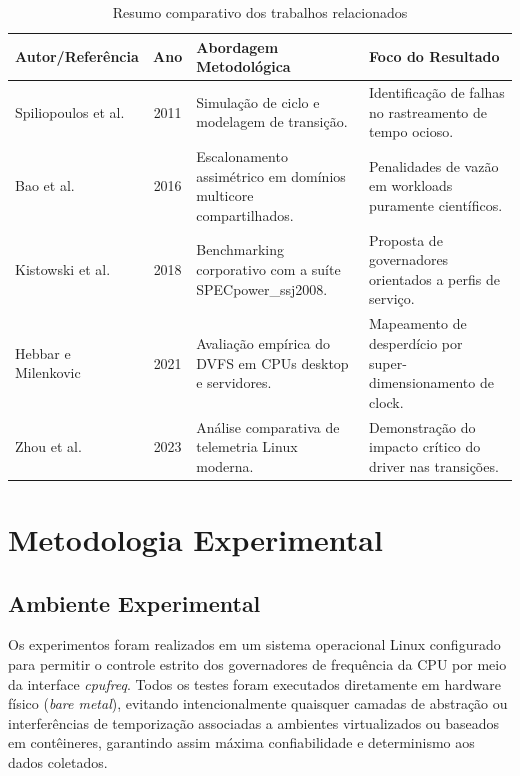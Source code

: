 \documentclass[12pt]{article}
\begin{document}
\begin{table}[ht]
\centering
\caption{Resumo comparativo dos trabalhos relacionados}
\label{tab:related}
\begin{tabular}{|p{3cm}|c|p{4.5cm}|p{4.5cm}|}
\hline
\textbf{Autor/Referência} & \textbf{Ano} & \textbf{Abordagem Metodológica} & \textbf{Foco do Resultado} \\
\hline
Spiliopoulos et al. \cite{spiliopoulos2011} & 2011 & Simulação de ciclo e modelagem de transição. & Identificação de falhas no rastreamento de tempo ocioso. \\
\hline
Bao et al. \cite{bao2016} & 2016 & Escalonamento assimétrico em domínios multicore compartilhados. & Penalidades de vazão em workloads puramente científicos. \\
\hline
Kistowski et al. \cite{kistowski2018} & 2018 & Benchmarking corporativo com a suíte SPECpower\_ssj2008. & Proposta de governadores orientados a perfis de serviço. \\
\hline
Hebbar e Milenkovic \cite{hebbar2021} & 2021 & Avaliação empírica do DVFS em CPUs desktop e servidores. & Mapeamento de desperdício por super-dimensionamento de clock. \\
\hline
Zhou et al. \cite{zhou2023} & 2023 & Análise comparativa de telemetria Linux moderna. & Demonstração do impacto crítico do driver nas transições. \\
\hline
\end{tabular}
\end{table}


\section{Metodologia Experimental}

\subsection{Ambiente Experimental}

Os experimentos foram realizados em um sistema operacional Linux configurado para permitir o controle estrito dos governadores de frequência da CPU por meio da interface \textit{cpufreq}. Todos os testes foram executados diretamente em hardware físico (\textit{bare metal}), evitando intencionalmente quaisquer camadas de abstração ou interferências de temporização associadas a ambientes virtualizados ou baseados em contêineres, garantindo assim máxima confiabilidade e determinismo aos dados coletados.
\end{document}
